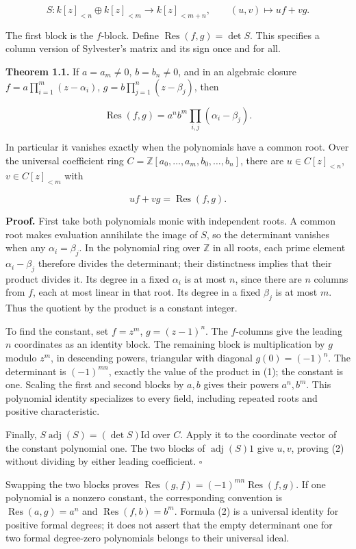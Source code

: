 \documentclass[
]{article}
\begin{document}
\[
S:k[z]_{<n}\oplus k[z]_{<m}\longrightarrow k[z]_{<m+n},
\qquad (u,v)\longmapsto uf+vg.
\]

The first block is the \(f\)-block. Define
\(\operatorname{Res}(f,g)=\det S\). This specifies a column version of
Sylvester's matrix and its sign once and for all.

\textbf{Theorem 1.1.} If \(a=a_m\ne0\), \(b=b_n\ne0\), and in an
algebraic closure \(f=a\prod_{i=1}^m(z-\alpha_i)\),
\(g=b\prod_{j=1}^n(z-\beta_j)\), then

\[
\operatorname{Res}(f,g)=a^n b^m\prod_{i,j}(\alpha_i-\beta_j).
\tag{1}
\]

In particular it vanishes exactly when the polynomials have a common
root. Over the universal coefficient ring
\(C=\mathbb Z[a_0,\ldots,a_m,b_0,\ldots,b_n]\), there are
\(u\in C[z]_{<n}\), \(v\in C[z]_{<m}\) with

\[
uf+vg=\operatorname{Res}(f,g).
\tag{2}
\]

\textbf{Proof.} First take both polynomials monic with independent
roots. A common root makes evaluation annihilate the image of \(S\), so
the determinant vanishes when any \(\alpha_i=\beta_j\). In the
polynomial ring over \(\mathbb Z\) in all roots, each prime element
\(\alpha_i-\beta_j\) therefore divides the determinant; their
distinctness implies that their product divides it. Its degree in a
fixed \(\alpha_i\) is at most \(n\), since there are \(n\) columns from
\(f\), each at most linear in that root. Its degree in a fixed
\(\beta_j\) is at most \(m\). Thus the quotient by the product is a
constant integer.

To find the constant, set \(f=z^m\), \(g=(z-1)^n\). The \(f\)-columns
give the leading \(n\) coordinates as an identity block. The remaining
block is multiplication by \(g\) modulo \(z^m\), in descending powers,
triangular with diagonal \(g(0)=(-1)^n\). The determinant is
\((-1)^{mn}\), exactly the value of the product in (1); the constant is
one. Scaling the first and second blocks by \(a,b\) gives their powers
\(a^n,b^m\). This polynomial identity specializes to every field,
including repeated roots and positive characteristic.

Finally, \(S\operatorname{adj}(S)=(\det S)\mathrm{Id}\) over \(C\).
Apply it to the coordinate vector of the constant polynomial one. The
two blocks of \(\operatorname{adj}(S)1\) give \(u,v\), proving (2)
without dividing by either leading coefficient. \(\square\)

Swapping the two blocks proves
\(\operatorname{Res}(g,f)=(-1)^{mn}\operatorname{Res}(f,g)\). If one
polynomial is a nonzero constant, the corresponding convention is
\(\operatorname{Res}(a,g)=a^n\) and \(\operatorname{Res}(f,b)=b^m\).
Formula (2) is a universal identity for positive formal degrees; it does
not assert that the empty determinant one for two formal degree-zero
polynomials belongs to their universal ideal.
\end{document}
